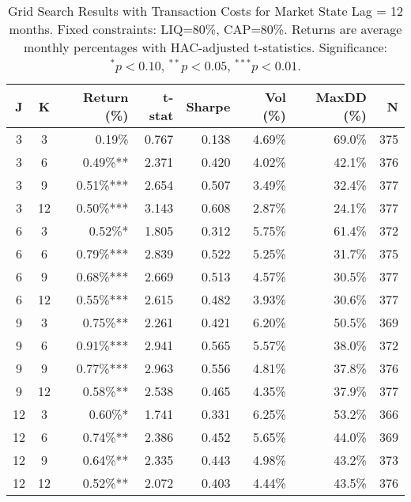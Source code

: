 \begin{table}[htbp]
\caption{Grid Search Results with Transaction Costs for Market State Lag = 12 months. Fixed constraints: LIQ=80\%, CAP=80\%. Returns are average monthly percentages with HAC-adjusted t-statistics. Significance: $^{*}p<0.10$, $^{**}p<0.05$, $^{***}p<0.01$.}
\label{tab:grid_costs_lag12}
\begin{tabular}{cc|rrrrrr}
\toprule
J & K & Return (\%) & t-stat & Sharpe & Vol (\%) & MaxDD (\%) & N \\
\midrule
3 & 3 & 0.19\% & 0.767 & 0.138 & 4.69\% & 69.0\% & 375 \\
3 & 6 & 0.49\%** & 2.371 & 0.420 & 4.02\% & 42.1\% & 376 \\
3 & 9 & 0.51\%*** & 2.654 & 0.507 & 3.49\% & 32.4\% & 377 \\
3 & 12 & 0.50\%*** & 3.143 & 0.608 & 2.87\% & 24.1\% & 377 \\
6 & 3 & 0.52\%* & 1.805 & 0.312 & 5.75\% & 61.4\% & 372 \\
6 & 6 & 0.79\%*** & 2.839 & 0.522 & 5.25\% & 31.7\% & 375 \\
6 & 9 & 0.68\%*** & 2.669 & 0.513 & 4.57\% & 30.5\% & 377 \\
6 & 12 & 0.55\%*** & 2.615 & 0.482 & 3.93\% & 30.6\% & 377 \\
9 & 3 & 0.75\%** & 2.261 & 0.421 & 6.20\% & 50.5\% & 369 \\
9 & 6 & 0.91\%*** & 2.941 & 0.565 & 5.57\% & 38.0\% & 372 \\
9 & 9 & 0.77\%*** & 2.963 & 0.556 & 4.81\% & 37.8\% & 376 \\
9 & 12 & 0.58\%** & 2.538 & 0.465 & 4.35\% & 37.9\% & 377 \\
12 & 3 & 0.60\%* & 1.741 & 0.331 & 6.25\% & 53.2\% & 366 \\
12 & 6 & 0.74\%** & 2.386 & 0.452 & 5.65\% & 44.0\% & 369 \\
12 & 9 & 0.64\%** & 2.335 & 0.443 & 4.98\% & 43.2\% & 373 \\
12 & 12 & 0.52\%** & 2.072 & 0.403 & 4.44\% & 43.5\% & 376 \\
\bottomrule
\end{tabular}
\end{table}
